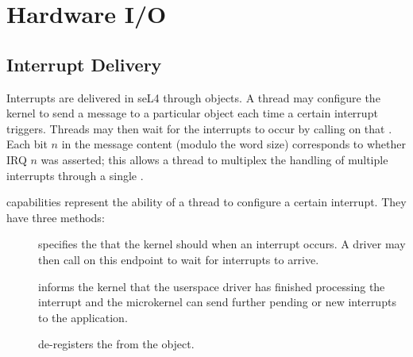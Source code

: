 %
%
%
%

\chapter{\label{ch:io}Hardware I/O}

\section{Interrupt Delivery}
\label{sec:interrupts}

Interrupts are delivered in seL4 through  objects. A thread
may configure the kernel to send a message to a particular 
object each time a certain interrupt triggers. Threads may then wait for
the interrupts to occur by calling  on
that . Each bit $n$ in the message content (modulo the
word size) corresponds to whether IRQ $n$ was asserted; this allows a
thread to multiplex the handling of multiple interrupts through a single
.

 capabilities represent the ability of a thread to
configure a certain interrupt. They have three methods:

\begin{description}

    \item[]
    specifies the  that the kernel should
     when an interrupt occurs. A driver
    may then call  on this endpoint to
    wait for interrupts to arrive.

    \item[]
    informs the kernel that the userspace driver has finished processing
    the interrupt and the microkernel can send further pending or new
    interrupts to the application.

    \item[]
    de-registers the  from the  object.

\end{description}

